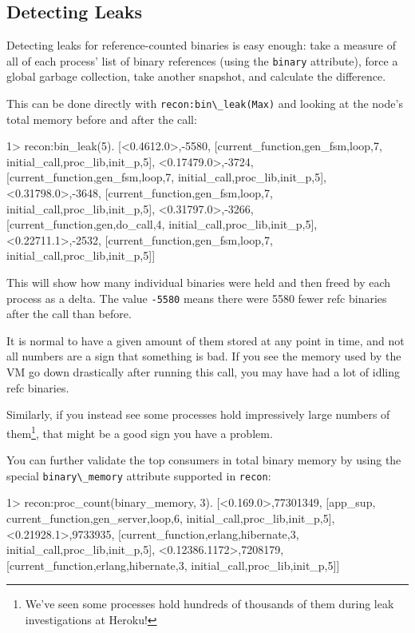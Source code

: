 \documentclass[11pt, oneside]{book}   	%
\newcommand{\otpapp}[1]{\Verb`#1`}
\newcommand{\function}[1]{\Verb`#1`}
\newcommand{\expression}[1]{\Verb`#1`}
\begin{document}
\subsection{Detecting Leaks}

Detecting leaks for reference-counted binaries is easy enough: take a measure of all of each process' list of binary references (using the \expression{binary} attribute), force a global garbage collection, take another snapshot, and calculate the difference.

This can be done directly with \function{recon:bin\_leak(Max)} and looking at the node's total memory before and after the call:

\begin{VerbatimEshell}
1> recon:bin_leak(5).
[{<0.4612.0>,-5580,
  [{current_function,{gen_fsm,loop,7}},
   {initial_call,{proc_lib,init_p,5}}]},
 {<0.17479.0>,-3724,
  [{current_function,{gen_fsm,loop,7}},
   {initial_call,{proc_lib,init_p,5}}]},
 {<0.31798.0>,-3648,
  [{current_function,{gen_fsm,loop,7}},
   {initial_call,{proc_lib,init_p,5}}]},
 {<0.31797.0>,-3266,
  [{current_function,{gen,do_call,4}},
   {initial_call,{proc_lib,init_p,5}}]},
 {<0.22711.1>,-2532,
  [{current_function,{gen_fsm,loop,7}},
   {initial_call,{proc_lib,init_p,5}}]}]
\end{VerbatimEshell}

This will show how many individual binaries were held and then freed by each process as a delta. The value \expression{-5580} means there were 5580 fewer refc binaries after the call than before.

It is normal to have a given amount of them stored at any point in time, and not all numbers are a sign that something is bad. If you see the memory used by the VM go down drastically after running this call, you may have had a lot of idling refc binaries.

Similarly, if you instead see some processes hold impressively large numbers of them\footnote{We've seen some processes hold hundreds of thousands of them during leak investigations at Heroku!}, that might be a good sign you have a problem.

You can further validate the top consumers in total binary memory by using the special \expression{binary\_memory} attribute supported in \otpapp{recon}:

\begin{VerbatimEshell}
1> recon:proc_count(binary_memory, 3).
[{<0.169.0>,77301349,
  [app_sup,
   {current_function,{gen_server,loop,6}},
   {initial_call,{proc_lib,init_p,5}}]},
 {<0.21928.1>,9733935,
  [{current_function,{erlang,hibernate,3}},
   {initial_call,{proc_lib,init_p,5}}]},
 {<0.12386.1172>,7208179,
  [{current_function,{erlang,hibernate,3}},
   {initial_call,{proc_lib,init_p,5}}]}]
\end{VerbatimEshell}
\end{document}
